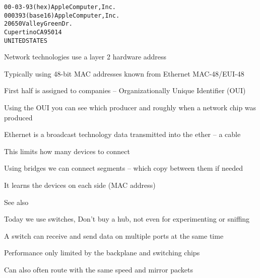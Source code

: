 \documentclass[Screen16to9,17pt]{foils}
\begin{document}
\begin{alltt}
00-03-93   (hex)        Apple Computer, Inc.
000393     (base 16)    Apple Computer, Inc.
                        20650 Valley Green Dr.
                        Cupertino CA 95014
                        UNITED STATES
\end{alltt}
\begin{list1}
\item Network technologies use a layer 2 hardware address
\item Typically using 48-bit MAC addresses known from Ethernet MAC-48/EUI-48
\item First half is assigned to companies -- Organizationally Unique Identifier (OUI)
\item Using the OUI you can see which producer and roughly when a network chip was produced
\item {}
\end{list1}



\begin{list1}
\item Ethernet is a broadcast technology data transmitted into the ether -- a cable
\item This limits how many devices to connect
\item Using bridges we can connect segments -- which copy between them if needed
\item It learns the devices on each side (MAC address)
\end{list1}

See also 




\begin{list1}
\item Today we use switches, Don't buy a hub, not even for experimenting or sniffing
\item A switch can receive and send data on multiple ports at the same time
\item Performance only limited by the backplane and switching chips
\item Can also often route with the same speed and mirror packets
\end{list1}



\end{document}
